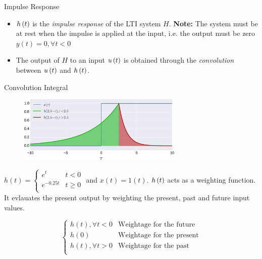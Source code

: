 \documentclass[aspectratio=169]{beamer}
\def\lp{\ensuremath\left(}
\def\rp{\ensuremath\right)}
\begin{document}
\begin{frame}[t]{Impulse Response}
\begin{itemize}
    \item $h\lp t\rp$ is the \textit{impulse response} of the LTI system $H$. \textbf{Note:} The system must be at rest when the impulse is applied at the input, i.e. the output must be zero $y(t) = 0, \forall t < 0$
    \item The output of $H$ to an input $u\lp t\rp$ is obtained through the \textit{convolution} between $u\lp t\rp$ and $h\lp t\rp$.
\end{itemize}
\end{frame}


\begin{frame}{Convolution Integral}
\begin{figure}
\includegraphics[width=0.7\textwidth]{img/imp_resp_mech.eps}
\end{figure}
\begin{small}
$h(t) = \begin{cases}
e^{t} & t < 0 \\
e^{-0.25t} & t \geq 0 \\
\end{cases}$ and $x(t) = 1(t)$. $h\lp t\rp$ acts as a weighting function. It evlauates the present output by weighting the present, past and future input values.

\[ \begin{cases}
h(t), \forall t < 0 & \text{Weightage for the future} \\
h(0) & \text{Weightage for the present} \\
h(t), \forall t > 0 & \text{Weightage for the past} \\
\end{cases}
\]
\end{small}
\end{frame}
\end{document}
